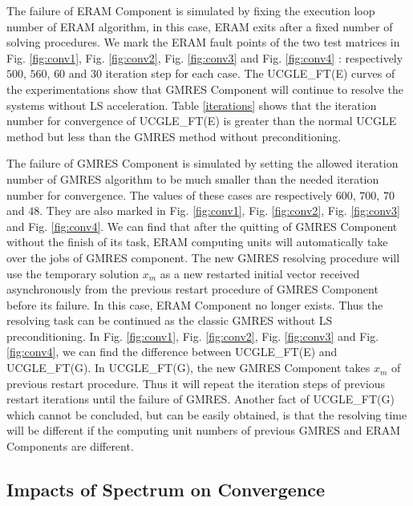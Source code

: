 The failure of ERAM Component is simulated by fixing the execution loop number of ERAM algorithm, in this case, ERAM exits after a fixed number of solving procedures. We mark the ERAM fault points of the two test matrices in Fig. \ref{fig:conv1}, Fig. \ref{fig:conv2},  Fig. \ref{fig:conv3} and Fig. \ref{fig:conv4} : respectively $500$, $560$, $60$ and $30$ iteration step for each case. The UCGLE\_FT(E) curves of the experimentations show that GMRES Component will continue to resolve the systems without LS acceleration. Table \ref{iterations} shows that the iteration number for convergence of UCGLE\_FT(E) is greater than the normal UCGLE method but less than the GMRES method without preconditioning.

The failure of GMRES Component is simulated by setting the allowed iteration number of GMRES algorithm to be much smaller than the needed iteration number for convergence. The values of these cases are respectively $600$, $700$, $70$ and $48$. They are also marked in Fig. \ref{fig:conv1}, Fig. \ref{fig:conv2}, Fig. \ref{fig:conv3} and Fig. \ref{fig:conv4}. We can find that after the quitting of GMRES Component without the finish of its task, ERAM computing units will automatically take over the jobs of GMRES component. The new GMRES resolving procedure will use the temporary solution $x_m$ as a new restarted initial vector received asynchronously from the previous restart procedure of GMRES Component before its failure. In this case, ERAM Component no longer exists. Thus the resolving task can be continued as the classic GMRES without LS preconditioning. In  Fig. \ref{fig:conv1}, Fig. \ref{fig:conv2}, Fig. \ref{fig:conv3} and Fig. \ref{fig:conv4}, we can find the difference between UCGLE\_FT(E) and UCGLE\_FT(G). In UCGLE\_FT(G), the new GMRES Component takes $x_m$ of previous restart procedure. Thus it will repeat the iteration steps of previous restart iterations until the failure of GMRES. Another fact of UCGLE\_FT(G) which cannot be concluded, but can be easily obtained, is that the resolving time will be different if the computing unit numbers of previous GMRES and ERAM Components are different.

\subsection{Impacts of Spectrum on Convergence}

